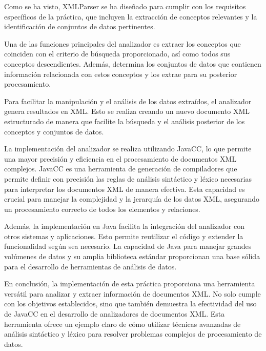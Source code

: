 Como se ha visto, XMLParser se ha diseñado para cumplir con los requisitos específicos de la práctica, que incluyen la extracción de conceptos relevantes y la identificación de conjuntos de datos pertinentes.

Una de las funciones principales del analizador es extraer los conceptos que coinciden con el criterio de búsqueda proporcionado, así como todos sus conceptos descendientes. Además, determina los conjuntos de datos que contienen información relacionada con estos conceptos y los extrae para su posterior procesamiento.

Para facilitar la manipulación y el análisis de los datos extraídos, el analizador genera resultados en XML. Esto se realiza creando un nuevo documento XML estructurado de manera que facilite la búsqueda y el análisis posterior de los conceptos y conjuntos de datos.

La implementación del analizador se realiza utilizando JavaCC, lo que permite una mayor precisión y eficiencia en el procesamiento de documentos XML complejos. JavaCC es una herramienta de generación de compiladores que permite definir con precisión las reglas de análisis sintáctico y léxico necesarias para interpretar los documentos XML de manera efectiva. Esta capacidad es crucial para manejar la complejidad y la jerarquía de los datos XML, asegurando un procesamiento correcto de todos los elementos y relaciones.

Además, la implementación en Java facilita la integración del analizador con otros sistemas y aplicaciones. Esto permite reutilizar el código y extender la funcionalidad según sea necesario. La capacidad de Java para manejar grandes volúmenes de datos y su amplia biblioteca estándar proporcionan una base sólida para el desarrollo de herramientas de análisis de datos.

En conclusión, la implementación de esta práctica proporciona una herramienta versátil para analizar y extraer información de documentos XML. No solo cumple con los objetivos establecidos, sino que también demuestra la efectividad del uso de JavaCC en el desarrollo de analizadores de documentos XML. Esta herramienta ofrece un ejemplo claro de cómo utilizar técnicas avanzadas de análisis sintáctico y léxico para resolver problemas complejos de procesamiento de datos.




